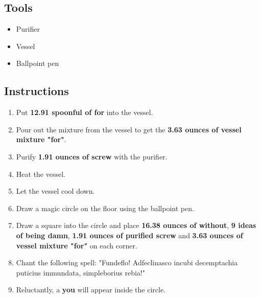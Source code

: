 \documentclass{article}
\begin{document}
\subsection{Tools}\begin{itemize}
\item 
Purifier
\item 
Vessel
\item 
Ballpoint pen
\end{itemize}
\subsection{Instructions}\begin{enumerate}
\item 
Put \textbf{12.91 spoonful of for} into the vessel.
\item 
Pour out the mixture from the vessel to get the \textbf{3.63 ounces of vessel mixture "for"}.
\item 
Purify \textbf{1.91 ounces of screw} with the purifier.
\item 
Heat the vessel.
\item 
Let the vessel cool down.
\item 
Draw a magic circle on the floor using the ballpoint pen.
\item 
Draw a square into the circle and place \textbf{16.38 ounces of without}, \textbf{9 ideas of being damn}, \textbf{1.91 ounces of purified screw} and \textbf{3.63 ounces of vessel mixture "for"} on each corner.
\item 
Chant the following spell: "Fundeflo! Adfeclinasco incubi decemptachia puticius immundata, simpleborius rebia!"
\item 
Reluctantly, a \textbf{you} will appear inside the circle.
\end{enumerate}
\newpage
\end{document}
